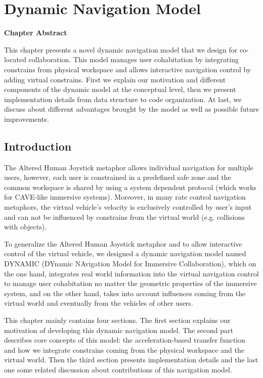\chapter{Dynamic Navigation Model}
\label{chapter:dynamic_model}
\pagebreak

\textbf{Chapter Abstract}

This chapter presents a novel dynamic navigation model that we design for co-located collaboration. This model manages user cohabitation by integrating constrains from physical workspace and allows interactive navigation control by adding virtual constrains. First we explain our motivation and different components of the dynamic model at the conceptual level, then we present implementation details from data structure to code organization. At last, we discuss about different advantages brought by the model as well as possible future improvements.

\vspace*{2\baselineskip}

\minitoc

\newpage
\section{Introduction}
The Altered Human Joystick metaphor allows individual navigation for multiple users, however, each user is constrained in a predefined safe zone and the common workspace is shared by using a system dependent protocol (which works for CAVE-like immersive systems). Moreover, in many rate control navigation metaphors, the virtual vehicle's velocity is exclusively controlled by user's input and can not be influenced by constrains from the virtual world (e.g. collisions with objects). 

To generalize the Altered Human Joystick metaphor and to allow interactive control of the virtual vehicle, we designed a dynamic navigation model named DYNAMIC (DYnamic NAvigation Model for Immersive Collaboration), which on the one hand, integrates real world information into the virtual navigation control to manage user cohabitation no matter the geometric properties of the immersive system, and on the other hand, takes into account influences coming from the virtual world and eventually from the vehicles of other users.

This chapter mainly contains four sections. The first section explains our motivation of developing this dynamic navigation model. The second part describes core concepts of this model: the acceleration-based transfer function and how we integrate constrains coming from the physical workspace and the virtual world. Then the third section presents implementation details and the last one some related discussion about contributions of this navigation model.

